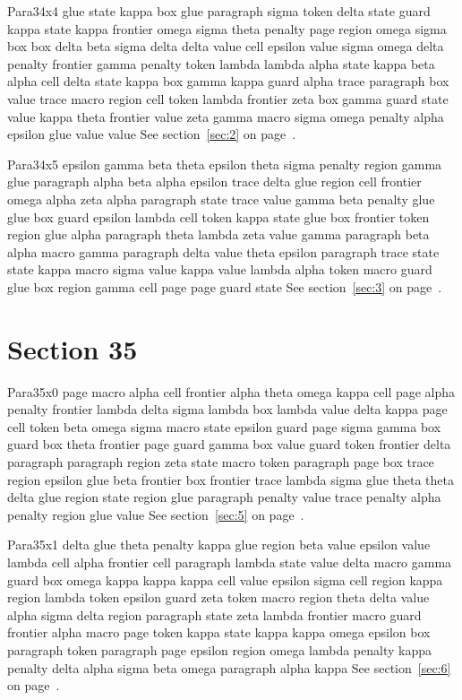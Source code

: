 \documentclass{article}
\begin{document}
Para34x4 glue state kappa box glue paragraph sigma token delta state guard kappa state kappa frontier omega sigma theta penalty page region omega sigma box box delta beta sigma delta delta value cell epsilon value sigma omega delta penalty frontier gamma penalty token lambda lambda alpha state kappa beta alpha cell delta state kappa box gamma kappa guard alpha trace paragraph box value trace macro region cell token lambda frontier zeta box gamma guard state value kappa theta frontier value zeta gamma macro sigma omega penalty alpha epsilon glue value value See section~\ref{sec:2} on page~\pageref{sec:26}.

Para34x5 epsilon gamma beta theta epsilon theta sigma penalty region gamma glue paragraph alpha beta alpha epsilon trace delta glue region cell frontier omega alpha zeta alpha paragraph state trace value gamma beta penalty glue glue box guard epsilon lambda cell token kappa state glue box frontier token region glue alpha paragraph theta lambda zeta value gamma paragraph beta alpha macro gamma paragraph delta value theta epsilon paragraph trace state state kappa macro sigma value kappa value lambda alpha token macro guard glue box region gamma cell page page guard state See section~\ref{sec:3} on page~\pageref{sec:27}.

\section{Section 35}\label{sec:35}
Para35x0 page macro alpha cell frontier alpha theta omega kappa cell page alpha penalty frontier lambda delta sigma lambda box lambda value delta kappa page cell token beta omega sigma macro state epsilon guard page sigma gamma box guard box theta frontier page guard gamma box value guard token frontier delta paragraph paragraph region zeta state macro token paragraph page box trace region epsilon glue beta frontier box frontier trace lambda sigma glue theta theta delta glue region state region glue paragraph penalty value trace penalty alpha penalty region glue value See section~\ref{sec:5} on page~\pageref{sec:25}.

Para35x1 delta glue theta penalty kappa glue region beta value epsilon value lambda cell alpha frontier cell paragraph lambda state value delta macro gamma guard box omega kappa kappa kappa cell value epsilon sigma cell region kappa region lambda token epsilon guard zeta token macro region theta delta value alpha sigma delta region paragraph state zeta lambda frontier macro guard frontier alpha macro page token kappa state kappa kappa omega epsilon box paragraph token paragraph page epsilon region omega lambda penalty kappa penalty delta alpha sigma beta omega paragraph alpha kappa See section~\ref{sec:6} on page~\pageref{sec:26}.
\end{document}
